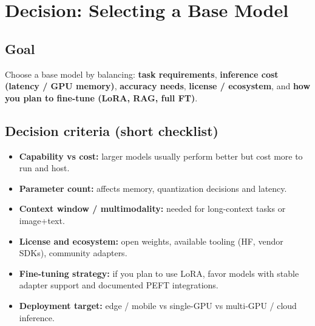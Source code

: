 \documentclass[a4paper, 12pt]{article}
\begin{document}
\section*{Decision: Selecting a Base Model}

\subsection*{Goal}
Choose a base model by balancing: \textbf{task requirements}, \textbf{inference cost (latency / GPU memory)}, \textbf{accuracy needs}, \textbf{license / ecosystem}, and \textbf{how you plan to fine-tune (LoRA, RAG, full FT)}.

\subsection*{Decision criteria (short checklist)}
\begin{itemize}
  \item \textbf{Capability vs cost:} larger models usually perform better but cost more to run and host.
  \item \textbf{Parameter count:} affects memory, quantization decisions and latency.
  \item \textbf{Context window / multimodality:} needed for long-context tasks or image+text.
  \item \textbf{License and ecosystem:} open weights, available tooling (HF, vendor SDKs), community adapters.
  \item \textbf{Fine-tuning strategy:} if you plan to use LoRA, favor models with stable adapter support and documented PEFT integrations.
  \item \textbf{Deployment target:} edge / mobile vs single-GPU vs multi-GPU / cloud inference.
\end{itemize}
\end{document}

